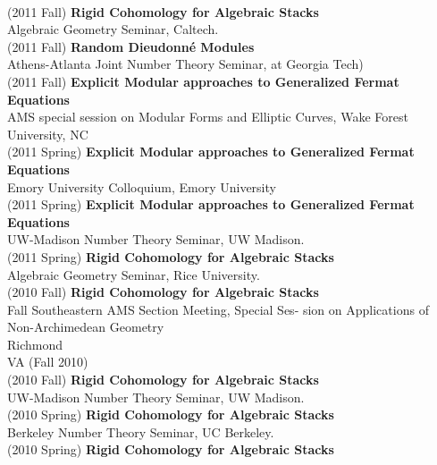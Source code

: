 \documentclass[margin,line]{res}
\begin{document}
\begin{resume}
\vspace{.05cm}\\
(2011 Fall) \textbf{Rigid Cohomology for Algebraic Stacks}\\
Algebraic Geometry Seminar, Caltech.
\vspace{.05cm}\\
(2011 Fall) \textbf{Random Dieudonn\'e Modules}\\
Athens-Atlanta Joint Number Theory Seminar, at Georgia Tech)
\vspace{.05cm}\\
(2011 Fall) \textbf{Explicit Modular approaches to Generalized Fermat Equations}\\
AMS special session on Modular Forms and Elliptic Curves, Wake Forest University, NC
\vspace{.05cm}\\
(2011 Spring) \textbf{Explicit Modular approaches to Generalized Fermat Equations}\\
Emory University Colloquium, Emory University
\vspace{.05cm}\\
(2011 Spring) \textbf{Explicit Modular approaches to Generalized Fermat Equations}\\
 UW-Madison Number Theory Seminar, UW Madison.
\vspace{.05cm}\\
(2011 Spring) \textbf{Rigid Cohomology for Algebraic Stacks}\\
Algebraic Geometry Seminar, Rice University.
\vspace{.05cm}\\
(2010 Fall) \textbf{Rigid Cohomology for Algebraic Stacks}\\
Fall Southeastern AMS Section Meeting, Special Ses-
sion on Applications of Non-Archimedean Geometry\\ Richmond\\ VA (Fall 2010)
\vspace{.05cm}\\
(2010 Fall) \textbf{Rigid Cohomology for Algebraic Stacks}\\
 UW-Madison Number Theory Seminar, UW Madison.
\vspace{.05cm}\\
(2010 Spring) \textbf{Rigid Cohomology for Algebraic Stacks}\\
 Berkeley Number Theory Seminar, UC Berkeley.
\vspace{.05cm}\\
(2010 Spring) \textbf{Rigid Cohomology for Algebraic Stacks}\\

\end{resume}
\end{document}
